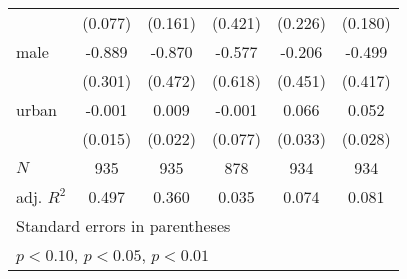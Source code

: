 {\begin{tabular}{l*{5}{c}}
            &     (0.077)         &     (0.161)         &     (0.421)         &     (0.226)         &     (0.180)         \\
[1em]
male        &      -0.889\sym{***}&      -0.870\sym{*}  &      -0.577         &      -0.206         &      -0.499         \\
            &     (0.301)         &     (0.472)         &     (0.618)         &     (0.451)         &     (0.417)         \\
[1em]
urban       &      -0.001         &       0.009         &      -0.001         &       0.066\sym{*}  &       0.052\sym{*}  \\
            &     (0.015)         &     (0.022)         &     (0.077)         &     (0.033)         &     (0.028)         \\
\hline
\(N\)       &         935         &         935         &         878         &         934         &         934         \\
adj. \(R^{2}\)&       0.497         &       0.360         &       0.035         &       0.074         &       0.081         \\
\hline\hline
\multicolumn{6}{l}{\footnotesize Standard errors in parentheses}\\
\multicolumn{6}{l}{\footnotesize \sym{*} \(p<0.10\), \sym{**} \(p<0.05\), \sym{***} \(p<0.01\)}\\
\end{tabular}
}
